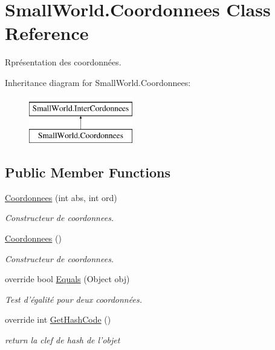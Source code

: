 \hypertarget{class_small_world_1_1_coordonnees}{\section{Small\-World.\-Coordonnees Class Reference}
\label{class_small_world_1_1_coordonnees}
}


Rprésentation des coordonnées.  


Inheritance diagram for Small\-World.\-Coordonnees\-:\begin{figure}[H]
\begin{center}
\leavevmode
\includegraphics[height=2.000000cm]{class_small_world_1_1_coordonnees}
\end{center}
\end{figure}
\subsection*{Public Member Functions}
\begin{DoxyCompactItemize}
\item 
\hyperlink{class_small_world_1_1_coordonnees_aec13aa49810f6cb62c6b73c04fa9ebbe}{Coordonnees} (int abs, int ord)
\begin{DoxyCompactList}\small\item\em Constructeur de coordonnees. \end{DoxyCompactList}\item 
\hyperlink{class_small_world_1_1_coordonnees_a3e91ea13cf001b39eb63ca45345fd058}{Coordonnees} ()
\begin{DoxyCompactList}\small\item\em Constructeur de coordonnees. \end{DoxyCompactList}\item 
override bool \hyperlink{class_small_world_1_1_coordonnees_aa5bcb46ee14473b4a7c62442f7290ce1}{Equals} (Object obj)
\begin{DoxyCompactList}\small\item\em Test d'égalité pour deux coordonnées. \end{DoxyCompactList}\item 
override int \hyperlink{class_small_world_1_1_coordonnees_a8e05913286d547f5261480d8f03c5453}{Get\-Hash\-Code} ()
\begin{DoxyCompactList}\small\item\em return la clef de hash de l'objet \end{DoxyCompactList}\end{DoxyCompactItemize}
